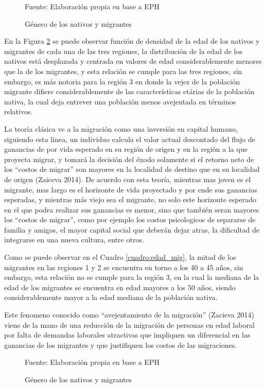 \documentclass[12pt,a4paper]{article}
\newcommand{\source}[1]{\caption*{\scriptsize{Fuente: {#1}}} }
\begin{document}
\begin{figure}[ht!]
\begin{center}
 
 	\caption{Género de los nativos y migrantes}
 	\label{figure:sexo_mig_}
	\source{Elaboración propia en base a EPH}
\end{center}

\end{figure}

\newpage
En la Figura \ref{figure:edad_mig} se puede observar función de densidad de la edad de los nativos y migrantes de cada una de las tres regiones, la distribución de la edad de los nativos  está desplazada y centrada en valores de edad considerablemente menores que la de los migrantes, y esta relación se cumple para las tres regiones, sin embargo, es más notoria para la región 3 en donde la vejez de la población migrante difiere considerablemente de las características etárias de la población nativa, la cual deja entrever una población menos avejentada en términos relativos.

La teoría clásica ve a la migración como una inversión en capital humano, siguiendo esta linea, un individuo calcula el valor actual descontado del flujo de ganancias de por vida esperado en su región de origen y en la región a la que proyecta migrar, y tomará la decisión del éxodo solamente si el retorno neto de los ``costos de migrar'' son mayores en la localidad de destino que en su localidad de origen (Zaiceva 2014). De acuerdo con esta teoría, mientras mas joven es el migrante, mas largo es el horizonte de vida proyectado y por ende sus ganancias esperadas, y mientras más viejo sea el migrante, no solo este horizonte esperado en el que podra realizar sus ganancias es menor, sino que también seran mayores  los ``costos de migrar'', como por ejemplo los costos psicologicos de separarse de familia y amigos, el mayor capital social que deberán dejar atras, la dificultad de integrarse en una nueva cultura, entre otros.

Como se puede observar en el Cuadro \ref{cuadro:edad_mig}, la mitad de los migrantes en las regiones 1 y 2 se encuentra en torno a los 40 a 45 años, sin embargo, esta relación no se cumple para la región 3, en la cual la mediana de la edad de los migrantes se encuentra en edad mayores a los 50 años, siendo considerablemente mayor a la edad mediana de la población nativa.

Este fenomeno conocido como ``avejentamiento de la migración'' (Zacieva 2014) viene de la mano de una reducción de la migración de personas en edad laboral por falta de demandas laborales atractivas que impliquen un diferencial en las ganancias de los migrantes y que justifiquen los costos de las migraciones.
\begin{figure}[ht!]
\begin{center}
 
\caption{Género de los nativos y migrantes}
\label{figure:edad_mig}
\source{Elaboración propia en base a EPH}
\end{center}
\end{figure}
\end{document}
